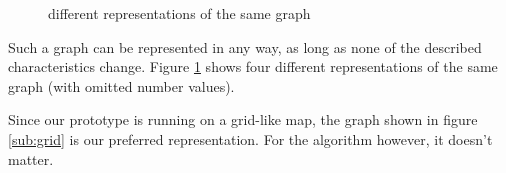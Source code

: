 \begin{figure}[htp]
    \centering
  	\caption{different representations of the same graph}
  	\label{fig:graphs}
\end{figure}

Such a graph can be represented in any way,
as long as none of the described characteristics change.
Figure \ref{fig:graphs} shows four different representations of the same graph (with omitted number values).

Since our prototype is running on a grid-like map,
the graph shown in figure \ref{sub:grid} is our preferred representation.
For the algorithm however, it doesn't matter.
\\\\

